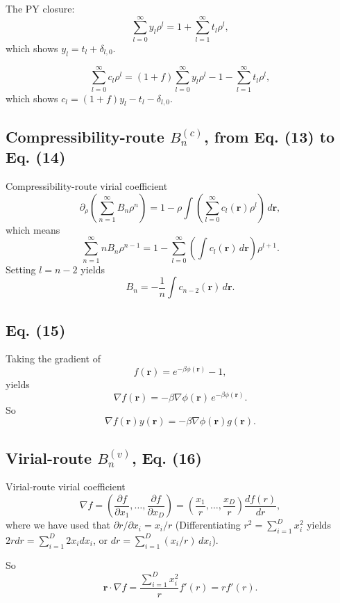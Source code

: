 \documentclass[aip,jcp,reprint,superscriptaddress]{revtex4-1}
\numberwithin{equation}{subsection}
\newcommand{\vct}[1]{\mathbf{#1}}
\providecommand{\vr}{} %
\renewcommand{\vr}{\vct{r}}
\begin{document}
The PY closure:
\[
  \sum_{l = 0}^{\infty} y_l \rho^l = 1 + \sum_{l = 1}^{\infty} t_l \rho^l,
\]
which shows $y_l = t_l + \delta_{l, 0}$.

\[
  \sum_{l = 0}^{\infty} c_l \rho^l
= (1 + f) \sum_{l = 0}^{\infty} y_l \rho^l
  - 1 - \sum_{l = 1}^{\infty} t_l \rho^l,
\]
which shows
$c_l = (1 + f) y_l - t_l - \delta_{l, 0}$.



\subsection{Compressibility-route $B_n^{(c)}$, from Eq. (13) to Eq. (14)}

Compressibility-route virial coefficient
\[
  \partial_\rho \left( \sum_{n = 1}^\infty B_n \rho^n \right)
=
  1 - \rho \int \left( \sum_{l = 0}^\infty c_l(\vr) \rho^l \right) \, d\vr,
\]
%
which means
%
\[
  \sum_{n = 1}^\infty n B_n \rho^{n - 1}
=
1 - \sum_{l = 0}^\infty \left( \int c_l(\vr) \, d\vr \right) \rho^{l+1}.
\]
Setting $l = n - 2$ yields
\[
  B_n = -\frac{1}{n} \int c_{n-2}(\vr) \, d\vr.
\]



\subsection{Eq. (15)}

Taking the gradient of
\[
  f(\vr) = e^{-\beta \phi(\vr)} - 1,
\]
yields
\[
  \nabla f(\vr) = -\beta \nabla \phi(\vr) \, e^{-\beta \phi(\vr)}.
\]
So
\[
  \nabla f(\vr) y(\vr) = -\beta \nabla \phi(\vr) g(\vr).
\]



\subsection{Virial-route $B_n^{(v)}$, Eq. (16)}

Virial-route virial coefficient
\[
  \nabla f =
  \left(
  \frac{ \partial f }
       { \partial x_1 },
  \dots,
  \frac{ \partial f }
       { \partial x_D }
  \right)
  =
  \left(
  \frac{ x_1 } { r },
  \dots,
  \frac{ x_D } { r }
  \right)
  \frac{ d f(r) }
       { d r },
\]
where we have used that $\partial r / \partial x_i = x_i / r$
(Differentiating $r^2 = \sum_{i = 1}^D x_i^2$
 yields $2 r dr = \sum_{i = 1}^D 2 x_i d x_i$,
 or $dr = \sum_{i = 1}^D (x_i/r) \, d x_i$).

So
\[
  \vr \cdot \nabla f
=
  \frac{
    \sum_{i = 1}^D x_i^2
  } { r }
  f'(r) = r f'(r).
\]
\end{document}
